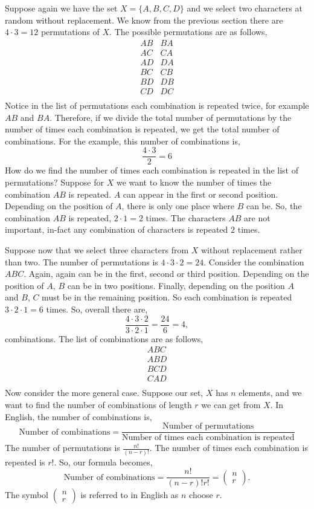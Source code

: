 \documentclass{article}
\begin{document}
Suppose again we have the set $X = \{ A, B, C, D \}$ and we select two characters at random without replacement. We know from the previous section there are $4 \cdot 3 = 12$ permutations of $X$. The possible permutations are as follows,
$$
\begin{matrix}
    AB & BA \\
    AC & CA \\
    AD & DA \\
    BC & CB \\
    BD & DB \\
    CD & DC \\
\end{matrix}
$$
Notice in the list of permutations each combination is repeated twice, for example $AB$ and $BA$. Therefore, if we divide the total number of permutations by the number of times each combination is repeated, we get the total number of combinations. For the example, this number of combinations is,
$$
\frac{4 \cdot 3}{2} = 6
$$
How do we find the number of times each combination is repeated in the list of permutations? Suppose for $X$ we want to know the number of times the combination $AB$ is repeated. $A$ can appear in the first or second position. Depending on the position of $A$, there is only one place where $B$ can be. So, the combination $AB$ is repeated, $2 \cdot 1 = 2$ times. The characters $AB$ are not important, in-fact any combination of characters is repeated $2$ times.

Suppose now that we select three characters from $X$ without replacement rather than two. The number of permutations is $4 \cdot 3 \cdot 2 = 24$. Consider the combination $ABC$. Again, again can be in the first, second or third position. Depending on the position of $A$, $B$ can be in two positions. Finally, depending on the position $A$ and $B$, $C$ must be in the remaining position. So each combination is repeated $3 \cdot 2 \cdot 1 = 6$ times. So, overall there are,
$$
    \frac{4 \cdot 3 \cdot 2}{3 \cdot 2 \cdot 1} = \frac{24}{6} = 4,
$$
combinations. The list of combinations are as follows,
$$
\begin{matrix}
    ABC \\    
    ABD \\
    BCD \\
    CAD \\
\end{matrix}
$$
Now consider the more general case. Suppose our set, $X$ has $n$ elements, and we want to find the number of combinations of length $r$ we can get from $X$. In English, the number of combinations is,
$$
\text{Number of combinations} = \frac{\text{Number of permutations}}{\text{Number of times each combination is repeated}}
$$
The number of permutations is $\frac{n!}{(n - r)!}$. The number of times each combination is repeated is $r!$. So, our formula becomes,
$$
\text{Number of combinations} = \frac{n!}{(n - r)!r!} = 
\begin{pmatrix} n \\ r \end{pmatrix}.
$$
The symbol $\begin{pmatrix}n \\ r\end{pmatrix}$ is referred to in English as $n$ choose $r$.
\end{document}
